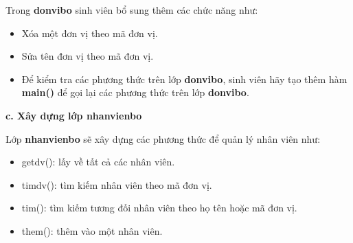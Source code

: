  Trong \textbf{donvibo} sinh viên bổ sung thêm các chức năng như:
 \begin{itemize}
 	\item Xóa một đơn vị theo mã đơn vị.
 	\item Sửa tên đơn vị theo mã đơn vị.
 	\item Để kiểm tra các phương thức trên lớp \textbf{donvibo}, sinh viên hãy tạo thêm hàm \textbf{main()} để gọi lại các phương thức trên lớp \textbf{donvibo}.\\
 \end{itemize}
 \textbf{c. Xây dựng lớp nhanvienbo}
 
  Lớp \textbf{nhanvienbo} sẽ xây dựng các phương thức để quản lý nhân viên như:
 \begin{itemize}
 	\item getdv(): lấy về tất cả các nhân viên.
 	\item timdv(): tìm kiếm nhân viên theo mã đơn vị.
 	\item tim(): tìm kiếm tương đối nhân viên theo họ tên hoặc mã đơn vị.
 	\item them(): thêm vào một nhân viên.
 \end{itemize} 
